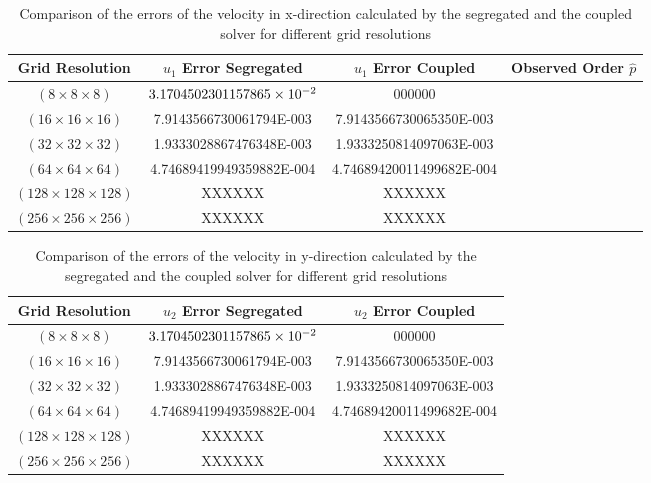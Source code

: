 \begin{table}[h!]
    \doublespacing
    \centering \begin{tabular}{ |c|c|c|c| }
    \hline
    Grid Resolution & \(u_1\) Error Segregated & \(u_1\) Error Coupled & Observed Order \(\hat{p}\) \\ \hline
    \((8\times8\times8)\)        &  \(3.1704502301157865\times 10^{-2}\)  &  000000 & \\ \hline 
    \((16\times16\times16)\)     &  7.9143566730061794E-003  &  7.9143566730065350E-003 &\\ \hline
    \((32\times32\times32)\)     &  1.9333028867476348E-003  &  1.9333250814097063E-003 &\\ \hline
    \((64\times64\times64)\)     &  4.74689419949359882E-004 &  4.74689420011499682E-004& \\ \hline
    \((128\times128\times128)\)  &  XXXXXX & XXXXXX &\\ \hline
    \((256\times256\times256)\)  &  XXXXXX & XXXXXX &\\ \hline
    \end{tabular}
    \caption{Comparison of the errors of the velocity in x-direction calculated by the segregated and the coupled solver for different grid resolutions}
    \label{tab:fehler}
\end{table}

\begin{table}[h!]
    \doublespacing
    \centering \begin{tabular}{ |c|c|c| }
    \hline
    Grid Resolution & \(u_2\) Error Segregated & \(u_2\) Error Coupled \\ \hline
  \((8\times8\times8)\)        &  \(3.1704502301157865\times 10^{-2}\)  &  000000 \\ \hline 
    \((16\times16\times16)\)     &  7.9143566730061794E-003  &  7.9143566730065350E-003 \\ \hline
    \((32\times32\times32)\)     &  1.9333028867476348E-003  &  1.9333250814097063E-003 \\ \hline
    \((64\times64\times64)\)     &  4.74689419949359882E-004 &  4.74689420011499682E-004 \\ \hline
    \((128\times128\times128)\)  &  XXXXXX & XXXXXX \\ \hline
    \((256\times256\times256)\)  &  XXXXXX & XXXXXX \\ \hline
    \end{tabular}
    \caption{Comparison of the errors of the velocity in y-direction calculated by the segregated and the coupled solver for different grid resolutions}
    \label{tab:fehler}
\end{table}

